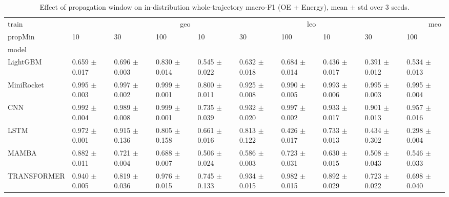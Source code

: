 \begin{table}
\caption{Effect of propagation window on in-distribution whole-trajectory macro-F1 (OE + Energy), mean $\pm$ std over 3 seeds.}
\label{tab:total_window}
\begin{tabular}{llllllllll}
\toprule
train & \multicolumn{3}{r}{geo} & \multicolumn{3}{r}{leo} & \multicolumn{3}{r}{meo} \\
propMin & 10 & 30 & 100 & 10 & 30 & 100 & 10 & 30 & 100 \\
model &  &  &  &  &  &  &  &  &  \\
\midrule
LightGBM & 0.659 $\pm$ 0.017 & 0.696 $\pm$ 0.003 & 0.830 $\pm$ 0.014 & 0.545 $\pm$ 0.022 & 0.632 $\pm$ 0.018 & 0.684 $\pm$ 0.014 & 0.436 $\pm$ 0.017 & 0.391 $\pm$ 0.012 & 0.534 $\pm$ 0.013 \\
MiniRocket & 0.995 $\pm$ 0.003 & 0.997 $\pm$ 0.002 & 0.999 $\pm$ 0.001 & 0.800 $\pm$ 0.011 & 0.925 $\pm$ 0.008 & 0.990 $\pm$ 0.005 & 0.993 $\pm$ 0.006 & 0.995 $\pm$ 0.003 & 0.995 $\pm$ 0.004 \\
CNN & 0.992 $\pm$ 0.004 & 0.989 $\pm$ 0.008 & 0.999 $\pm$ 0.001 & 0.735 $\pm$ 0.039 & 0.932 $\pm$ 0.020 & 0.997 $\pm$ 0.002 & 0.933 $\pm$ 0.017 & 0.901 $\pm$ 0.013 & 0.957 $\pm$ 0.016 \\
LSTM & 0.972 $\pm$ 0.001 & 0.915 $\pm$ 0.136 & 0.805 $\pm$ 0.158 & 0.661 $\pm$ 0.016 & 0.813 $\pm$ 0.122 & 0.426 $\pm$ 0.017 & 0.733 $\pm$ 0.013 & 0.434 $\pm$ 0.302 & 0.298 $\pm$ 0.004 \\
MAMBA & 0.882 $\pm$ 0.011 & 0.721 $\pm$ 0.004 & 0.688 $\pm$ 0.007 & 0.506 $\pm$ 0.024 & 0.586 $\pm$ 0.003 & 0.723 $\pm$ 0.031 & 0.630 $\pm$ 0.015 & 0.508 $\pm$ 0.043 & 0.546 $\pm$ 0.033 \\
TRANSFORMER & 0.940 $\pm$ 0.005 & 0.819 $\pm$ 0.036 & 0.976 $\pm$ 0.015 & 0.745 $\pm$ 0.133 & 0.934 $\pm$ 0.015 & 0.982 $\pm$ 0.015 & 0.892 $\pm$ 0.029 & 0.723 $\pm$ 0.022 & 0.698 $\pm$ 0.040 \\
\bottomrule
\end{tabular}
\end{table}
